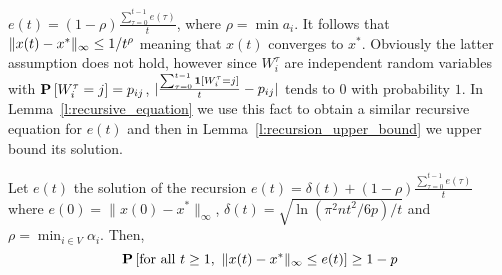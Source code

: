 $e(t) = (1-\rho)\frac{\sum_{\tau=0}^{t-1}e(\tau)}{t}$, where
$\rho = \min a_i$.
It follows that $\| x(t)-x^* \|_{\infty} \leq 1/t^\rho$
meaning that $x(t)$ converges to $x^*$.
Obviously the latter assumption does not hold,
however since $W_i^{\tau}$ are independent random variables
with $\bm{\mathrm{P}}\left[W_i^\tau = j\right]=p_{ij}$,
$|\frac{\sum_{\tau=0}^{t-1} \bm{1}{\left[W_i^{\tau}=j\right]}}{t} - p_{ij}|$
tends to $0$ with probability $1$.
In Lemma~\ref{l:recursive_equation} we use this fact
to obtain a similar recursive equation for $e(t)$
and then in Lemma~\ref{l:recursion_upper_bound}
we upper bound its solution.
\begin{lemma}\label{l:recursive_equation}
Let $e(t)$ the solution of the recursion
\(e(t) =\delta(t) + (1-\rho)\frac{\sum_{\tau=0}^{t-1}e(\tau)}{t}\)
where $e(0)=\|x(0) - x^*\|_{\infty}$,
\(\delta(t) = \sqrt{\ln(\pi^2n t^2/6p)/t}\)
and $\rho = \min_{i \in V}\alpha_i$. Then,
\[\bm{\mathrm{P}}\left[\text{for all }t \geq 1, ~\| x(t)-x^* \|_{\infty}\leq e(t)\right] \geq 1-p\]
\end{lemma}
